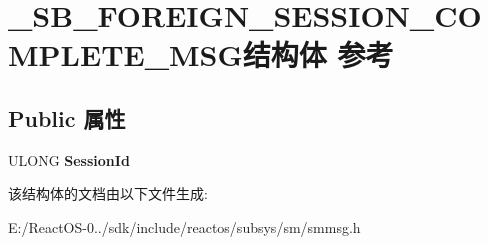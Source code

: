 \hypertarget{struct___s_b___f_o_r_e_i_g_n___s_e_s_s_i_o_n___c_o_m_p_l_e_t_e___m_s_g}{}\section{\+\_\+\+S\+B\+\_\+\+F\+O\+R\+E\+I\+G\+N\+\_\+\+S\+E\+S\+S\+I\+O\+N\+\_\+\+C\+O\+M\+P\+L\+E\+T\+E\+\_\+\+M\+S\+G结构体 参考}
\label{struct___s_b___f_o_r_e_i_g_n___s_e_s_s_i_o_n___c_o_m_p_l_e_t_e___m_s_g}
\subsection*{Public 属性}
\begin{DoxyCompactItemize}
\item 
\mbox{\label{struct___s_b___f_o_r_e_i_g_n___s_e_s_s_i_o_n___c_o_m_p_l_e_t_e___m_s_g_af88ad0e59bfdf08ae3dfd0bbd49d6a03}} 
U\+L\+O\+NG {\bfseries Session\+Id}
\end{DoxyCompactItemize}


该结构体的文档由以下文件生成\+:\begin{DoxyCompactItemize}
\item 
E\+:/\+React\+O\+S-\/0../sdk/include/reactos/subsys/sm/smmsg.\+h\end{DoxyCompactItemize}
